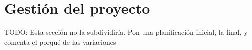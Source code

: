 \chapter{Gestión del proyecto}









TODO: Esta sección no la subdividiría. Pon una planificación inicial, la final, y comenta el porqué de las variaciones
